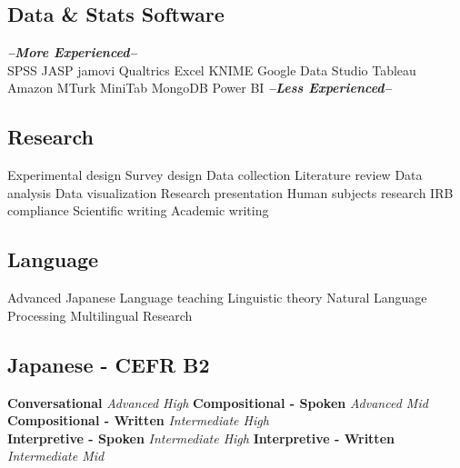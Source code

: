 \documentclass[letterpaper]{deedy-resume_sm} %
\begin{document}
\subsection{Data \& Stats Software}
{\footnotesize \textit{\textbf{--More Experienced--}}}\\
SPSS \textbullet{} JASP \textbullet{} jamovi \textbullet{} Qualtrics \textbullet{} Excel \textbullet{} KNIME \textbullet{} Google Data Studio \textbullet{} Tableau \textbullet{} Amazon MTurk \textbullet{} MiniTab \textbullet{} MongoDB \textbullet{} Power BI
{\footnotesize \textit{\textbf{--Less Experienced--}}}\\
\sectionspace
\subsection{Research}
Experimental design \textbullet{} Survey design \textbullet{} Data collection \textbullet{} Literature review \textbullet{} Data analysis \textbullet{} Data visualization \textbullet{} Research presentation \textbullet{} Human subjects research \textbullet{} IRB compliance \textbullet{} Scientific writing  \textbullet{} Academic writing
\sectionspace
\subsection{Language}
Advanced Japanese \textbullet{} Language teaching \textbullet{} Linguistic theory \textbullet{} Natural Language Processing \textbullet{} Multilingual Research\\
\sectionspace 
\subsection{Japanese - CEFR B2}
\textbf{Conversational} {\footnotesize \textit{Advanced High}} \textbullet{}
\textbf{Compositional - Spoken} {\footnotesize \textit{Advanced Mid}} \textbullet{}
\textbf{Compositional - Written} {\footnotesize \textit{Intermediate High}} \\
\textbf{Interpretive - Spoken} {\footnotesize \textit{Intermediate High}} \textbullet{}
\textbf{Interpretive - Written} {\footnotesize \textit{Intermediate Mid}}
\sectionspace 

\end{document}
